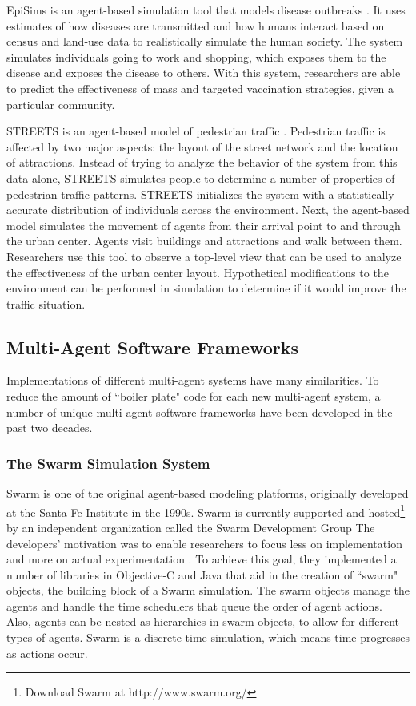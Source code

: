 EpiSims is an agent-based simulation tool that models disease outbreaks \cite{eubank2004modelling}.
It uses estimates of how diseases are transmitted and how humans interact based on census and land-use data to realistically simulate the human society.
The system simulates individuals going to work and shopping, which exposes them to the disease and exposes the disease to others.
With this system, researchers are able to predict the effectiveness of mass and targeted vaccination strategies, given a particular community.

STREETS is an agent-based model of pedestrian traffic \cite{schelhorn1999streets}.
Pedestrian traffic is affected by two major aspects: the layout of the street network and the location of attractions.
Instead of trying to analyze the behavior of the system from this data alone, STREETS simulates people to determine a number of properties of pedestrian traffic patterns.
STREETS initializes the system with a statistically accurate distribution of individuals across the environment.
Next, the agent-based model simulates the movement of agents from their arrival point to and through the urban center.
Agents visit buildings and attractions and walk between them.
Researchers use this tool to observe a top-level view that can be used to analyze the effectiveness of the urban center layout.
Hypothetical modifications to the environment can be performed in simulation to determine if it would improve the traffic situation.



\subsection{Multi-Agent Software Frameworks}
Implementations of different multi-agent systems have many similarities.
To reduce the amount of ``boiler plate" code for each new multi-agent system, a number of unique multi-agent software frameworks have been developed in the past two decades.

\subsubsection{The Swarm Simulation System}
Swarm is one of the original agent-based modeling platforms, originally developed at the Santa Fe Institute in the 1990s.
Swarm is currently supported and hosted\footnote{Download Swarm at http://www.swarm.org/} by an independent organization called the Swarm Development Group
The developers' motivation was to enable researchers to focus less on implementation and more on actual experimentation \cite{minar1996swarm}.
To achieve this goal, they implemented a number of libraries in Objective-C and Java that aid in the creation of ``swarm" objects, the building block of a Swarm simulation.
The swarm objects manage the agents and handle the time schedulers that queue the order of agent actions.
Also, agents can be nested as hierarchies in swarm objects, to allow for different types of agents.
Swarm is a discrete time simulation, which means time progresses as actions occur.

